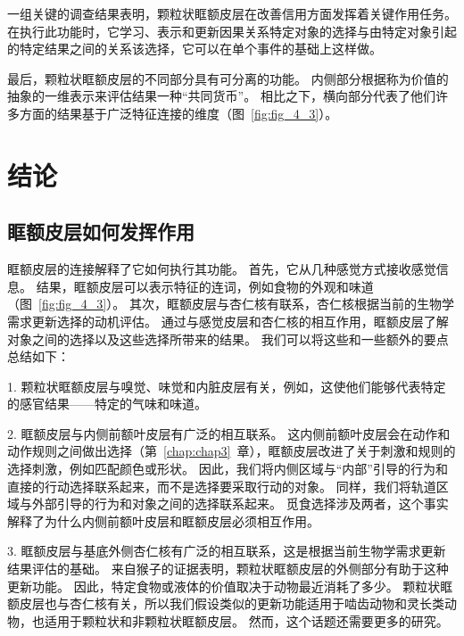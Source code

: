 一组关键的调查结果表明，颗粒状眶额皮层在改善信用方面发挥着关键作用任务。
在执行此功能时，它学习、表示和更新因果关系特定对象的选择与由特定对象引起的特定结果之间的关系该选择，它可以在单个事件的基础上这样做。\par


最后，颗粒状眶额皮层的不同部分具有可分离的功能。
内侧部分根据称为价值的抽象的一维表示来评估结果一种“共同货币”。
相比之下，横向部分代表了他们许多方面的结果基于广泛特征连接的维度（图~\ref{fig:fig_4_3}）。\par



\section{结论}

\subsection{眶额皮层如何发挥作用}

眶额皮层的连接解释了它如何执行其功能。
首先，它从几种感觉方式接收感觉信息。
结果，眶额皮层可以表示特征的连词，例如食物的外观和味道（图~\ref{fig:fig_4_3}）。
其次，眶额皮层与杏仁核有联系，杏仁核根据当前的生物学需求更新选择的动机评估。
通过与感觉皮层和杏仁核的相互作用，眶额皮层了解对象之间的选择以及这些选择所带来的结果。
我们可以将这些和一些额外的要点总结如下：\par


1. 颗粒状眶额皮层与嗅觉、味觉和内脏皮层有关，例如，这使他们能够代表特定的感官结果——特定的气味和味道。\par


2. 眶额皮层与内侧前额叶皮层有广泛的相互联系。
这内侧前额叶皮层会在动作和动作规则之间做出选择（第~\ref{chap:chap3}~章），眶额皮层改进了关于刺激和规则的选择刺激，例如匹配颜色或形状。
因此，我们将内侧区域与“内部”引导的行为和直接的行动选择联系起来，而不是选择要采取行动的对象。
同样，我们将轨道区域与外部引导的行为和对象之间的选择联系起来。
觅食选择涉及两者，这个事实解释了为什么内侧前额叶皮层和眶额皮层必须相互作用。\par


3. 眶额皮层与基底外侧杏仁核有广泛的相互联系，这是根据当前生物学需求更新结果评估的基础。
来自猴子的证据表明，颗粒状眶额皮层的外侧部分有助于这种更新功能。
因此，特定食物或液体的价值取决于动物最近消耗了多少。
颗粒状眶额皮层也与杏仁核有关，所以我们假设类似的更新功能适用于啮齿动物和灵长类动物，也适用于颗粒状和非颗粒状眶额皮层。
然而，这个话题还需要更多的研究。\par



